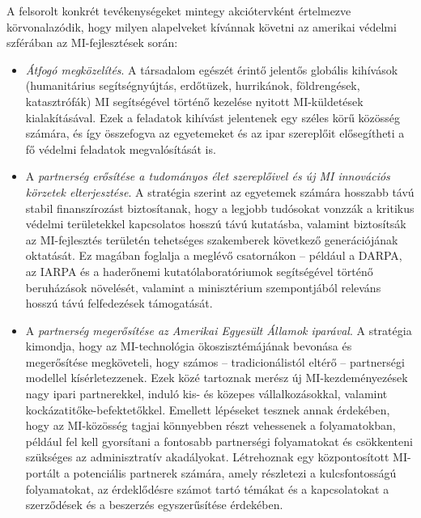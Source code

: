 \documentclass[
]{thesis-ekf}
\theoremstyle{definition}
\theoremstyle{remark}
\begin{document}


A felsorolt konkrét tevékenységeket mintegy akciótervként értelmezve körvonalazódik, hogy milyen alapelveket kívánnak követni az amerikai védelmi szférában az MI-fejlesztések során:

\begin{itemize}
	\item \emph{Átfogó megközelítés}. A társadalom egészét érintő jelentős globális kihívások (humanitárius segítségnyújtás, erdőtüzek, hurrikánok, földrengések, katasztrófák) MI segítségével történő kezelése nyitott MI-küldetések kialakításával. Ezek a feladatok kihívást jelentenek egy széles körű közösség számára, és így összefogva az egyetemeket és az ipar szereplőit elősegítheti a fő védelmi feladatok megvalósítását is.
	\item A \emph{partnerség erősítése a tudományos élet szereplőivel és új MI innovációs körzetek elterjesztése}. A stratégia szerint az egyetemek számára hosszabb távú stabil finanszírozást biztosítanak, hogy a legjobb tudósokat vonzzák a kritikus védelmi területekkel kapcsolatos hosszú távú kutatásba, valamint biztosítsák az MI-fejlesztés területén tehetséges szakemberek következő generációjának oktatását. Ez magában foglalja a meglévő csatornákon – például a DARPA, az IARPA és a haderőnemi kutatólaboratóriumok segítségével történő beruházások növelését, valamint a minisztérium szempontjából releváns hosszú távú felfedezések támogatását.
	\item A \emph{partnerség megerősítése az Amerikai Egyesült Államok iparával}. A stratégia kimondja, hogy az MI-technológia ökoszisztémájának bevonása és megerősítése megköveteli, hogy számos -- tradicionálistól eltérő -- partnerségi modellel kísérletezzenek. Ezek közé tartoznak merész új MI-kezdeményezések nagy ipari partnerekkel, induló kis- és közepes vállalkozásokkal, valamint kockázatitőke-befektetőkkel. Emellett lépéseket tesznek annak érdekében, hogy az MI-közösség tagjai könnyebben részt vehessenek a folyamatokban, például fel kell gyorsítani a fontosabb partnerségi folyamatokat és csökkenteni szükséges az adminisztratív akadályokat. Létrehoznak egy központosított MI-portált a potenciális partnerek számára, amely részletezi a kulcsfontosságú folyamatokat, az érdeklődésre számot tartó témákat és a kapcsolatokat a szerződések és a beszerzés egyszerűsítése érdekében.

\end{itemize}
\end{document}
